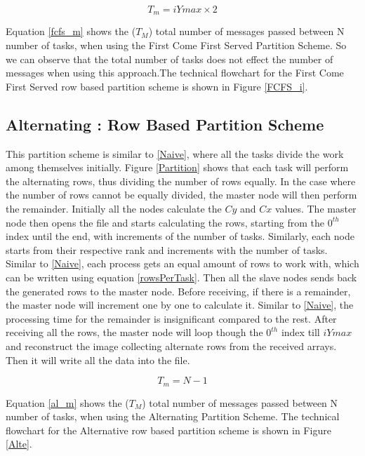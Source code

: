 \documentclass[conference]{IEEEtran}
\begin{document}
			\begin{equation}
			T_m = iYmax \times 2
			\label{fcfs_m}
			\end{equation}
			
			Equation \ref{fcfs_m} shows the ($T_M$) total number of messages passed between N number of tasks, when using the First Come First Served Partition Scheme. So we can observe that the total number of tasks does not effect the number of messages when using this approach.The technical flowchart for the First Come First Served row based partition scheme is shown in Figure \ref{FCFS_i}.
		

			\subsection{Alternating : Row Based Partition Scheme}\label{Alternating}
			This partition scheme is similar to \ref{Naive}, where all the tasks divide the work among themselves initially. Figure \ref{Partition} shows that each task will perform the alternating rows, thus dividing the number of rows equally. In the case where the number of rows cannot be equally divided, the master node will then perform the remainder. Initially all the nodes calculate the $Cy$ and $Cx$ values. The master node then opens the file and starts calculating the rows, starting from the $0^{th}$ index until the end, with increments of the number of tasks. Similarly, each node starts from their respective rank and increments with the number of tasks. Similar to \ref{Naive}, each process gets an equal amount of rows to work with, which can be written using equation \ref{rowsPerTask}. Then all the slave nodes sends back the generated rows to the master node. Before receiving, if there is a remainder, the master node will increment one by one to calculate it. Similar to \ref{Naive}, the processing time for the remainder is insignificant compared to the rest. After receiving all the rows, the master node will loop though the $0^{th}$ index till $iYmax$ and reconstruct the image collecting alternate rows from the received arrays. Then it will write all the data into the file.
					
			\begin{equation}
			T_m =  N - 1
			\label{al_m}
			\end{equation}
			
			Equation \ref{al_m} shows the ($T_M$) total number of messages passed between N number of tasks, when using the Alternating Partition Scheme. The technical flowchart for the Alternative row based partition scheme is shown in Figure \ref{Alte}.
\end{document}

